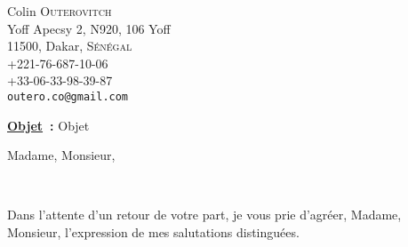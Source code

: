 \documentclass{article}
\begin{document}
\vspace*{\fill}
\noindent{}
\vspace*{\fill}

\newpage
\thispagestyle{empty}
\null
\newpage

\raggedright{
Colin \textsc{Outerovitch} \\
Yoff Apecsy 2, N920, 106 Yoff \\
11500, Dakar, \textsc{Sénégal} \\
+221-76-687-10-06 \\
+33-06-33-98-39-87 \\
\texttt{outero.co@gmail.com} \\
}



\justifying
\vspace{1em}
\noindent\textbf{\underline{Objet}~:} \quad Objet
\vspace{1em}

\noindent Madame, Monsieur, \bigskip

\lipsum[2] \smallskip

\lipsum[2] \medskip

\lipsum[2] \bigskip

\lipsum[2] \\

\lipsum[2] \bigskip

Dans l’attente d’un retour de votre part, je vous prie
d’agréer, Madame, Monsieur, l’expression de mes salutations
distinguées.

\end{document}
